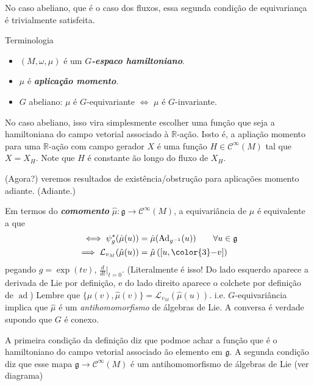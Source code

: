 No caso abeliano, que é o caso dos fluxos, essa segunda condição de equivariança é trivialmente satisfeita.

\begin{thing5}{Terminologia}\leavevmode
	\begin{itemize}
	\item $(M,\omega,\mu)$ é um  \textit{\textbf{$G$-espaco hamiltoniano}}.
	\item $\mu$ é \textit{\textbf{aplicação momento}}.
	\item $G$ abeliano: $\mu$ é $G$-equivariante $\iff$ $\mu$ é $G$-invariante.
	\end{itemize}
\end{thing5}

\begin{example}\leavevmode
No caso abeliano, isso vira simplesmente escolher uma função que seja a hamiltoniana do campo vetorial associado à $ \mathbb{R}$-ação. Issto é, a apliação momento para uma $\mathbb{R}$-ação com campo gerador $X$ é uma função $H\in\mathcal{C}^\infty(M)$ tal que $X=X_H$. Note que  $H$ é constante ão longo do fluxo de $X_H$.
	\end{example}

	(Agora?) veremos resultados de existência/obstrução para aplicações momento adiante. (Adiante.)

\begin{remark}\leavevmode
	Em termos do \textit{\textbf{comomento}}  $\hat{\mu}:\mathfrak{g}\longrightarrow \mathcal{C}^\infty(M)$, a equivariância de $\mu$ é equivalente a que
	\begin{align*}
		\iff \psi^* _g(\hat{\mu}(u))&=\hat{\mu}(\operatorname{Ad}_{g^{-1}}(u))\qquad \forall u\in\mathfrak{g}\\
		\implies \mathcal{L}_{v_M}(\hat{\mu}(u))&=\hat{\mu}\left( [u,{\color{3}-}v] \right) 
	\end{align*}
	pegando $g=\operatorname{exp}(tv)$, $\frac{d}{dt}\Big|_{t=0}$. {\color{3}(Literalmente é isso! Do lado esquerdo aparece a derivada de Lie por definição, e do lado direito aparece o colchete por definição de $\operatorname{ad}$)} Lembre que $\{\hat{\mu}(v),\hat{\mu}(v)\} =\mathcal{L}_{v_M}(\hat{\mu}(u))$.
	i.e. $G$-equivariância implica que $\hat{\mu}$ é um \textit{antihomomorfismo} de álgebras de Lie. A conversa é verdade supondo que $G$ é conexo.
\end{remark}

\begin{remark}\leavevmode
	A primeira condição da definição diz que podmoe achar a função que é o hamiltoniano do campo vetorial associado ão elemento em $\mathfrak{g}$. A segunda condição diz que esse mapa $\mathfrak{g} \longrightarrow \mathcal{C}^\infty(M)$ é um antihomomorfismo de álgebras de Lie (ver diagrama)
\end{remark}

